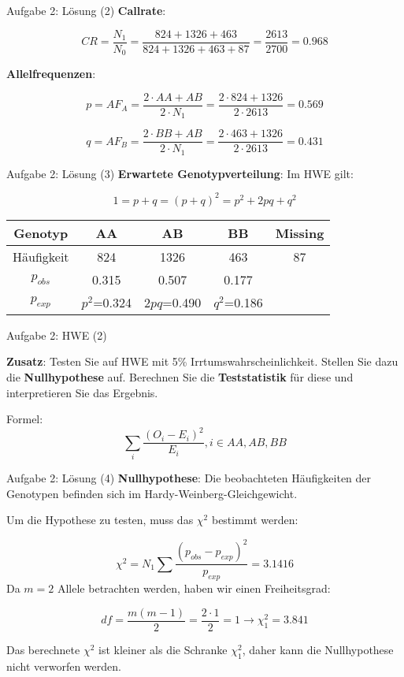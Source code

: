 \documentclass{beamer}
\begin{document}
\begin{frame}{Aufgabe 2: Lösung (2)}
\textbf{Callrate}: 

$$CR =\frac{N_1}{N_0} = \frac{824 + 1326 + 463}{824 + 1326 + 463 + 87} = \frac{2613}{2700}=0.968$$

\textbf{Allelfrequenzen}: 

$$p = AF_A = \frac{2 \cdot AA + AB}{2 \cdot N_1} = \frac{2 \cdot 824 + 1326}{2 \cdot 2613} = 0.569$$

$$q = AF_B = \frac{2 \cdot BB + AB}{2 \cdot N_1} = \frac{2 \cdot 463 + 1326}{2 \cdot 2613} = 0.431$$

\end{frame}

\begin{frame}{Aufgabe 2: Lösung (3)}
\textbf{Erwartete Genotypverteilung}: Im HWE gilt: 

$$1 = p+q = (p+q)^2 = p^2 + 2pq + q^2$$

\begin{table}[h]
\begin{center}
\begin{tabular}[h]{ccccc}
Genotyp & AA & AB & BB & Missing \\
\hline
Häufigkeit & 824 & 1326 & 463 & 87\\
\hline
$p_{obs}$ & 0.315 & 0.507 & 0.177 & \\
\hline
$p_{exp}$ & $p^2$=0.324 & $2pq$=0.490 & $q^2$=0.186 &  \\
\end{tabular}
\end{center}
\end{table}
\end{frame}

\begin{frame}{Aufgabe 2: HWE (2)}

\textbf{Zusatz}: Testen Sie auf HWE mit 5\% Irrtumswahrscheinlichkeit. Stellen Sie dazu die \textbf{Nullhypothese} auf. Berechnen Sie die \textbf{Teststatistik} für diese und interpretieren Sie das Ergebnis. 

Formel: $$\sum_i\frac{(O_i - E_i)^2}{E_i}, i\in {AA, AB, BB}$$
  
\end{frame}

\begin{frame}{Aufgabe 2: Lösung (4)}
\textbf{Nullhypothese}: Die beobachteten Häufigkeiten der Genotypen befinden sich im Hardy-Weinberg-Gleichgewicht. 

Um die Hypothese zu testen, muss das $\chi^2$ bestimmt werden: 

$$ \chi^2 = N_1 \sum \frac{(p_{obs} - p_{exp})^2}{p_{exp}}= 3.1416$$
Da $m=2$ Allele betrachten werden, haben wir einen Freiheitsgrad: 

$$df = \frac{m(m-1)}{2}=\frac{2 \cdot 1}{2}=1 \rightarrow \chi_1^2=3.841$$

Das berechnete $\chi^2$ ist kleiner als die Schranke $\chi_1^2$, daher kann die Nullhypothese nicht verworfen werden. 

\end{frame}
\end{document}
